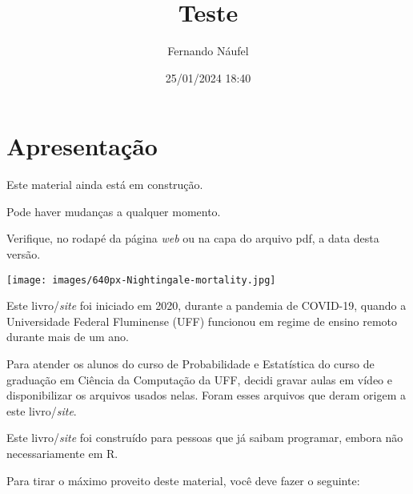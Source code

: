 \documentclass[
  letterpaper,
  DIV=11,
  numbers=noendperiod]{scrreprt}
\title{Teste}
\author{Fernando Náufel}
\date{25/01/2024 18:40}
\renewcommand*\contentsname{Índice}
\newcommand\contentsname{Índice}
\begin{document}
\maketitle


\renewcommand*\contentsname{Índice}
{
\hypersetup{linkcolor=}
\setcounter{tocdepth}{2}
\tableofcontents
}

\chapter*{Apresentação}\label{apresentacao}


\begin{tcolorbox}[enhanced jigsaw, coltitle=black, colbacktitle=quarto-callout-caution-color!10!white, title=\textcolor{quarto-callout-caution-color}{\faFire}\hspace{0.5em}{Cuidado}, toprule=.15mm, leftrule=.75mm, opacityback=0, colback=white, arc=.35mm, breakable, bottomtitle=1mm, left=2mm, toptitle=1mm, titlerule=0mm, rightrule=.15mm, bottomrule=.15mm, opacitybacktitle=0.6, colframe=quarto-callout-caution-color-frame]

Este material ainda está em construção.

Pode haver mudanças a qualquer momento.

Verifique, no rodapé da página \emph{web} ou na capa do arquivo pdf, a
data desta versão.

\end{tcolorbox}

\texttt{[image: images/640px-Nightingale-mortality.jpg]}

Este livro/\emph{site} foi iniciado em 2020, durante a pandemia de
COVID-19, quando a Universidade Federal Fluminense (UFF) funcionou em
regime de ensino remoto durante mais de um ano.

Para atender os alunos do curso de Probabilidade e Estatística do curso
de graduação em Ciência da Computação da UFF, decidi gravar aulas em
vídeo e disponibilizar os arquivos usados nelas. Foram esses arquivos
que deram origem a este livro/\emph{site}.

Este livro/\emph{site} foi construído para pessoas que já saibam
programar, embora não necessariamente em R.

Para tirar o máximo proveito deste material, você deve fazer o seguinte:
\end{document}
